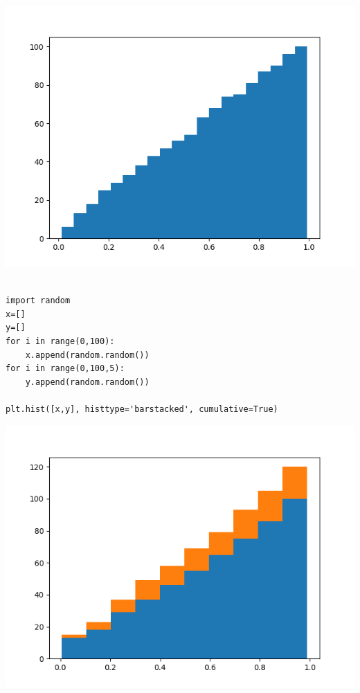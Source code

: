 \documentclass[11pt]{article}
\begin{document}
\begin{center}
\includegraphics[width=.9\linewidth]{fig14.png}
\end{center}

\newpage
\begin{verbatim}

import random
x=[]
y=[]
for i in range(0,100):
    x.append(random.random())
for i in range(0,100,5):
    y.append(random.random())

plt.hist([x,y], histtype='barstacked', cumulative=True)

\end{verbatim}

\begin{center}
\includegraphics[width=.9\linewidth]{fig15.png}
\end{center}
\end{document}
